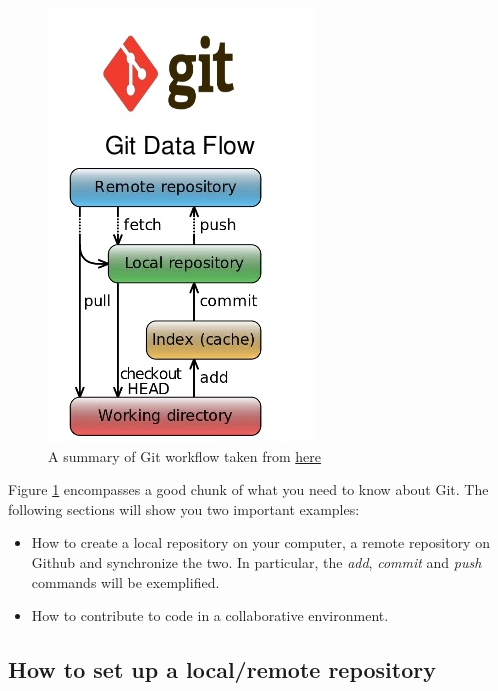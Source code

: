 \documentclass{report}
\begin{document}
\begin{figure}[H]
\centering
\includegraphics[scale=0.6]{git_workflow}
\caption{A summary of Git workflow taken from \href{http://www.slideshare.net/VinothKumarKannan/svn-vs-mercurial-vs-github}{here} }
\label{fig:git_workflow}
\end{figure}
Figure \ref{fig:git_workflow} encompasses a good chunk of what you need to know about Git. The following sections will show you two important examples:
\begin{itemize}
\item [1.] How to create a local repository on your computer, a remote repository on Github and synchronize the two. In particular, the \textit{add}, \textit{commit} and \textit{push} commands will be exemplified. 
\item [2.] How to contribute to code in a collaborative environment.
\end{itemize}
\subsection{How to set up a local/remote repository}
\end{document}
